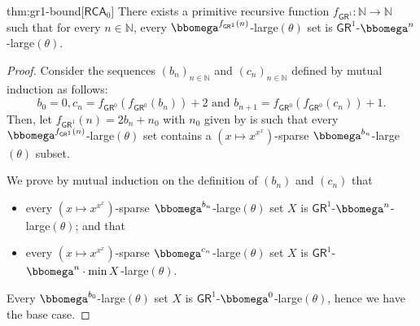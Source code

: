 \documentclass{article}
\numberwithin{theorem}{section}
\newcommand{\RCA}{\mathsf{RCA}}
\newcommand{\GR}{\mathsf{GR}}
\newcommand{\NN}{\mathbb{N}}
\begin{document}
\begin{reptheorem}{thm:gr1-bound}[$\RCA_0$]
    There exists a primitive recursive function $f_{\GR^1} : \NN \to \NN$ such that for every $n  \in \NN$, every $\bbomega^{f_{\GR^1}(n)}$-large$(\theta)$ set is $\GR^1$-$\bbomega^n$-large$(\theta)$.
\end{reptheorem}
\begin{proof}
Consider the sequences $(b_n)_{n \in \NN}$ and $(c_n)_{n \in \NN}$ defined by mutual induction as follows: 
$$b_0 = 0, c_{n} = f_{\GR^0}(f_{\GR^0}(b_n)) + 2 \text{ and }  b_{n+1} = f_{\GR^0}(f_{\GR^0}(c_{n})) + 1.$$ 
Then, let $f_{\GR^1}(n) = 2b_n + n_0$ with $n_0$ given by  is such that every $\bbomega^{f_{\GR^1}(n)}$-large$(\theta)$ set contains a $(x \mapsto x^{x^x})$-sparse $\bbomega^{b_n}$-large$(\theta)$ subset.

We prove by mutual induction on the definition of $(b_n)$ and $(c_n)$ that 
\begin{itemize}
    \item[(1)] every $(x \mapsto x^{x^x})$-sparse $\bbomega^{b_n}$-large$(\theta)$ set $X$ is $\GR^1$-$\bbomega^n$-large$(\theta)$; and that
    \item[(2)] every $(x \mapsto x^{x^x})$-sparse $\bbomega^{c_n}$-large$(\theta)$ set $X$ is $\GR^1$-$\bbomega^n\cdot \min X$-large$(\theta)$.
\end{itemize}
Every $\bbomega^{b_0}$-large$(\theta)$ set $X$ is $\GR^1$-$\bbomega^0$-large$(\theta)$, hence we have the base case.


\end{proof}
\end{document}
